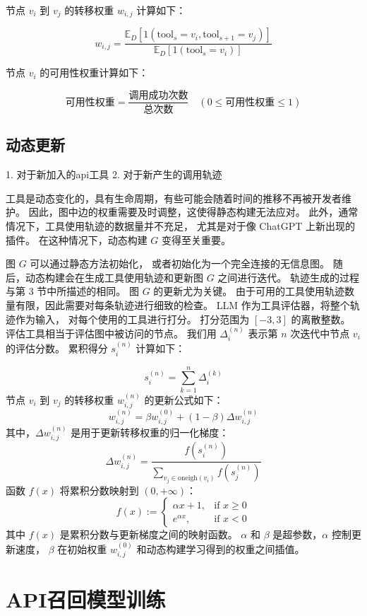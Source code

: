 节点 $v_i$ 到 $v_j$ 的转移权重 $w_{i,j}$ 计算如下：

\[
w_{i,j} = \frac{\mathbb{E}_D[1(\text{tool}_s = v_i, \text{tool}_{s+1} = v_j)]}{\mathbb{E}_D[1(\text{tool}_s = v_i)]}
\]

节点 $v_i$ 的可用性权重计算如下：

\[
\text{可用性权重} = \frac{\text{调用成功次数}}{\text{总次数}} \quad (0 \leq \text{可用性权重} \leq 1)
\]


\subsection{动态更新}  

1. 对于新加入的api工具
2. 对于新产生的调用轨迹

工具是动态变化的，具有生命周期，有些可能会随着时间的推移不再被开发者维护。
因此，图中边的权重需要及时调整，这使得静态构建无法应对。
此外，通常情况下，工具使用轨迹的数据量并不充足，
尤其是对于像 ChatGPT 上新出现的插件。
在这种情况下，动态构建 $G$ 变得至关重要。 

图 $G$ 可以通过静态方法初始化，
或者初始化为一个完全连接的无信息图。
随后，动态构建会在生成工具使用轨迹和更新图 $G$ 之间进行迭代。
轨迹生成的过程与第 3 节中所描述的相同。
图 $G$ 的更新尤为关键。
由于可用的工具使用轨迹数量有限，因此需要对每条轨迹进行细致的检查。
LLM 作为工具评估器，将整个轨迹作为输入，
对每个使用的工具进行打分。
打分范围为 $[-3, 3]$ 的离散整数。
评估工具相当于评估图中被访问的节点。
我们用 $\Delta_i^{(n)}$ 表示第 $n$ 次迭代中节点 $v_i$ 的评估分数。
累积得分 $s_i^{(n)}$ 计算如下：

\[
s_i^{(n)} = \sum_{k=1}^{n} \Delta_i^{(k)}
\]
节点 $v_i$ 到 $v_j$ 的转移权重 $w_{i,j}^{(n)}$ 的更新公式如下：
\[
w_{i,j}^{(n)} = \beta w_{i,j}^{(0)} + (1 - \beta) \Delta w_{i,j}^{(n)}
\]
其中，$\Delta w_{i,j}^{(n)}$ 是用于更新转移权重的归一化梯度：
\[
\Delta w_{i,j}^{(n)} = \frac{f(s_i^{(n)})}{\sum_{v_j \in \text{oneigh}(v_i)} f(s_j^{(n)})}
\]
函数 $f(x)$ 将累积分数映射到 $(0,+\infty)$：
\[
f(x) :=
\begin{cases}
\alpha x + 1, & \text{if } x \geq 0 \\
e^{\alpha x}, & \text{if } x < 0
\end{cases}
\]
其中 $f(x)$ 是累积分数与更新梯度之间的映射函数。
$\alpha$ 和 $\beta$ 是超参数，$\alpha$ 控制更新速度，
$\beta$ 在初始权重 $w_{i,j}^{(0)}$ 和动态构建学习得到的权重之间插值。


\section{API召回模型训练}

